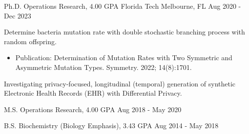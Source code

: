\vspace{-4mm}
\vspace{-2mm}

\begin{cventries}

	\cventry
	{Ph.D. Operations Research, 4.00 GPA}
	{Florida Tech}
	{Melbourne, FL}
	{Aug 2020 - Dec 2023}
	{\begin{cvitems}
			\item {Determine bacteria mutation rate with double stochastic branching process with random offspring.
			            \begin{itemize}
				            \item {Publication: Determination of Mutation Rates with Two Symmetric and Asymmetric Mutation Types. Symmetry. 2022; 14(8):1701.}
			            \end{itemize}}
			\item {Investigating privacy-focused, longitudinal (temporal) generation of synthetic Electronic Health Records (EHR) with Differential Privacy.}
		\end{cvitems}}

	\vspace{-2mm}

	\cventry
	{M.S. Operations Research, 4.00 GPA}
	{}
	{}
	{Aug 2018 - May 2020}
	{}
	\vspace{-7mm}

	\cventry
	{B.S. Biochemistry (Biology Emphasis), 3.43 GPA}
	{}
	{}
	{Aug 2014 - May 2018}
	{}
	\vspace{-7mm}

\end{cventries}